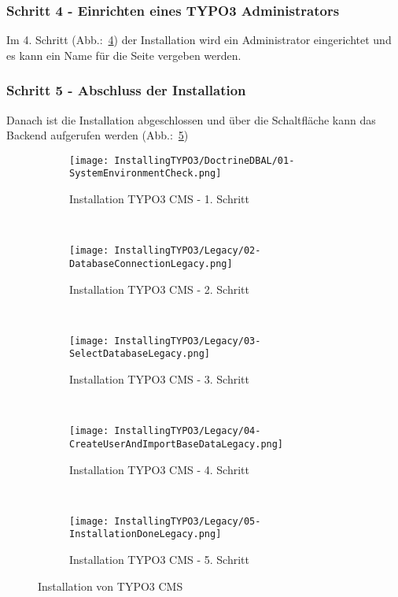 \subsubsection{Schritt 4 - Einrichten eines TYPO3 Administrators}
\label{prototype:subsec:FourCreateAdmin}
	Im 4. Schritt (Abb.:~\ref{fig:installTYPO3LegacyStepFour}) der Installation wird ein Administrator eingerichtet und es kann ein Name für die Seite vergeben werden.

\subsubsection{Schritt 5 - Abschluss der Installation}
\label{prototype:subsec:FiveDone}
	Danach ist die Installation abgeschlossen und über die Schaltfläche kann das Backend aufgerufen werden (Abb.:~\ref{fig:installTYPO3LegacyStepFive})

	\begin{figure}[H]
		\begin{subfigure}[b]{0.5\textwidth}
			\texttt{[image: InstallingTYPO3/DoctrineDBAL/01-SystemEnvironmentCheck.png]}
			\caption{Installation TYPO3 CMS - 1. Schritt}
			\label{fig:installTYPO3LegacyStepOne}
		\end{subfigure}%
		~ %
		\begin{subfigure}[b]{0.5\textwidth}
			\texttt{[image: InstallingTYPO3/Legacy/02-DatabaseConnectionLegacy.png]}
			\caption{Installation TYPO3 CMS - 2. Schritt}
			\label{fig:installTYPO3LegacyStepTwo}
		\end{subfigure}
		~ %
		\begin{subfigure}[b]{0.5\textwidth}
			\texttt{[image: InstallingTYPO3/Legacy/03-SelectDatabaseLegacy.png]}
			\caption{Installation TYPO3 CMS - 3. Schritt}
			\label{fig:installTYPO3LegacyStepThree}
		\end{subfigure}%
		~ %
		\begin{subfigure}[b]{0.5\textwidth}
			\texttt{[image: InstallingTYPO3/Legacy/04-CreateUserAndImportBaseDataLegacy.png]}
			\caption{Installation TYPO3 CMS - 4. Schritt}
			\label{fig:installTYPO3LegacyStepFour}
		\end{subfigure}
		~ %
		\begin{subfigure}[b]{0.5\textwidth}
			\texttt{[image: InstallingTYPO3/Legacy/05-InstallationDoneLegacy.png]}
			\caption{Installation TYPO3 CMS - 5. Schritt}
			\label{fig:installTYPO3LegacyStepFive}
		\end{subfigure}%
		\caption{Installation von TYPO3 CMS}
		\label{fig:installationOfTYPO3}
	\end{figure}
